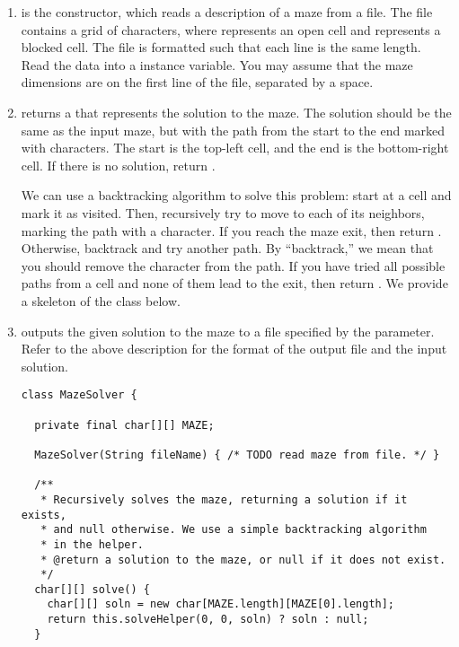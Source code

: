 
\begin{enumerate}[label=(\alph*)]
    \item {} is the constructor, which reads a description of a maze from a file. The file contains a grid of characters, where  represents an open cell and  represents a blocked cell. The file is formatted such that each line is the same length. Read the data into a  instance variable. You may assume that the maze dimensions are on the first line of the file, separated by a space.

    \item {} returns a  that represents the solution to the maze. The solution should be the same as the input maze, but with the path from the start to the end marked with  characters. The start is the top-left cell, and the end is the bottom-right cell. If there is no solution, return .

    We can use a backtracking algorithm to solve this problem: start at a cell and mark it as visited. Then, recursively try to move to each of its neighbors, marking the path with a  character. If you reach the maze exit, then return . Otherwise, backtrack and try another path. By ``backtrack,'' we mean that you should remove the  character from the path. If you have tried all possible paths from a cell and none of them lead to the exit, then return . We provide a skeleton of the class below.

    \item {} outputs the given solution to the maze to a file specified by the parameter. Refer to the above description for the format of the output file and the input  solution.

\begin{lstlisting}[language=MyJava]
class MazeSolver {

  private final char[][] MAZE;

  MazeSolver(String fileName) { /* TODO read maze from file. */ }

  /**
   * Recursively solves the maze, returning a solution if it exists, 
   * and null otherwise. We use a simple backtracking algorithm 
   * in the helper.
   * @return a solution to the maze, or null if it does not exist.
   */
  char[][] solve() {
    char[][] soln = new char[MAZE.length][MAZE[0].length];
    return this.solveHelper(0, 0, soln) ? soln : null;
  }


\end{lstlisting}
\end{enumerate}
